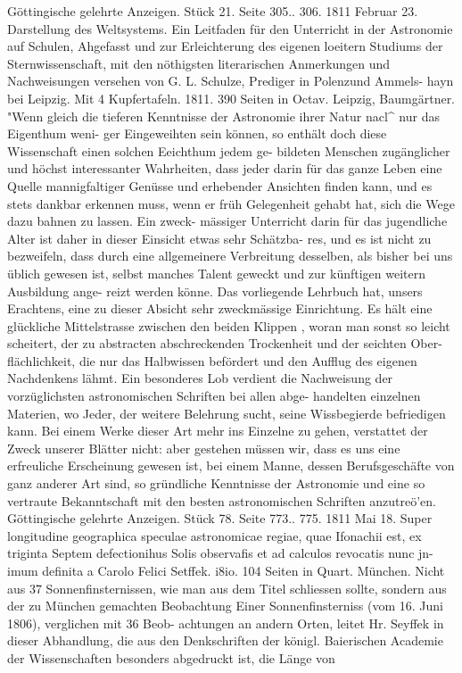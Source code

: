 \documentclass[12pt,a4paper]{article}
\begin{document}
Göttingische  gelehrte  Anzeigen.     Stück  21.     Seite  305.. 306.     1811  Februar  23. Darstellung  des  Weltsystems.  Ein  Leitfaden  für  den  Unterricht  in  der  Astronomie  auf  Schulen, Ahgefasst  und  zur  Erleichterung  des  eigenen  loeitern  Studiums  der  Sternwissenschaft,  mit  den  nöthigsten literarischen  Anmerkungen  und  Nachweisungen  versehen  von  G.  L.  Schulze,  Prediger  in  Polenzund  Ammels- hayn  bei  Leipzig.     Mit  4  Kupfertafeln.     1811.     390  Seiten  in  Octav.     Leipzig,  Baumgärtner. "Wenn  gleich  die  tieferen  Kenntnisse  der  Astronomie  ihrer  Natur  nacl\textasciicircum{}  nur  das  Eigenthum  weni- ger Eingeweihten  sein  können,  so  enthält  doch  diese  Wissenschaft  einen  solchen  Eeichthum  jedem  ge- bildeten Menschen  zugänglicher  und  höchst  interessanter  Wahrheiten,  dass  jeder  darin  für  das  ganze Leben  eine  Quelle  mannigfaltiger  Genüsse  und  erhebender  Ansichten  finden  kann,  und  es  stets  dankbar erkennen  muss,  wenn  er  früh  Gelegenheit  gehabt  hat,  sich  die  Wege  dazu  bahnen  zu  lassen.  Ein  zweck- mässiger Unterricht  darin  für  das  jugendliche  Alter  ist  daher  in  dieser  Einsicht  etwas  sehr  Schätzba- res, und  es  ist  nicht  zu  bezweifeln,  dass  durch  eine  allgemeinere  Verbreitung  desselben,  als  bisher  bei uns  üblich  gewesen  ist,  selbst  manches  Talent  geweckt  und  zur  künftigen  weitern  Ausbildung  ange- reizt werden  könne.  Das  vorliegende  Lehrbuch  hat,  unsers  Erachtens,  eine  zu  dieser  Absicht  sehr zweckmässige  Einrichtung.  Es  hält  eine  glückliche  Mittelstrasse  zwischen  den  beiden  Klippen ,  woran man  sonst  so  leicht  scheitert,  der  zu  abstracten  abschreckenden  Trockenheit  und  der  seichten  Ober- flächlichkeit, die  nur  das  Halbwissen  befördert  und  den  Aufflug  des  eigenen  Nachdenkens  lähmt.  Ein besonderes  Lob  verdient  die  Nachweisung  der  vorzüglichsten  astronomischen  Schriften  bei  allen  abge- handelten einzelnen  Materien,  wo  Jeder,  der  weitere  Belehrung  sucht,  seine  Wissbegierde  befriedigen kann.  Bei  einem  Werke  dieser  Art  mehr  ins  Einzelne  zu  gehen,  verstattet  der  Zweck  unserer  Blätter nicht:  aber  gestehen  müssen  wir,  dass  es  uns  eine  erfreuliche  Erscheinung  gewesen  ist,  bei  einem Manne,  dessen  Berufsgeschäfte  von  ganz  anderer  Art  sind,  so  gründliche  Kenntnisse  der  Astronomie und  eine  so  vertraute  Bekanntschaft  mit  den  besten  astronomischen  Schriften  anzutreö'en. Göttingische  gelehrte  Anzeigen.    Stück  78.  Seite  773.. 775.     1811  Mai  18. Super  longitudine  geographica  speculae  astronomicae  regiae,  quae  Ifonachii  est,  ex  triginta  Septem defectionihus  Solis  observafis  et  ad  calculos  revocatis  nunc  jn-imum  definita  a  Carolo  Felici  Setffek.  i8io. 104  Seiten  in  Quart.     München. Nicht  aus  37  Sonnenfinsternissen,  wie  man  aus  dem  Titel  schliessen  sollte,  sondern  aus  der  zu München  gemachten  Beobachtung  Einer  Sonnenfinsterniss  (vom  16.  Juni  1806),  verglichen  mit  36  Beob- achtungen an  andern  Orten,  leitet  Hr.  Seyffek  in  dieser  Abhandlung,  die  aus  den  Denkschriften  der königl.  Baierischen  Academie  der  Wissenschaften  besonders  abgedruckt  ist,  die  Länge  von 
\end{document}
